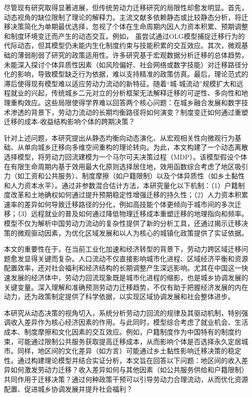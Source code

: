 \documentclass[a4paper,12pt,oneside, fontset=mac]{ctexbook} %
\begin{document}
尽管现有研究取得显著进展，但传统劳动力迁移研究的局限性却愈发明显。首先，动态视角的缺位限制了理论的解释力。主流文献多依赖静态或比较静态分析，将迁移决策简化为单期最优选择，忽视了个体在生命周期内因人力资本积累、预期调整和制度环境变迁而产生的动态交互。例如，
\cite{HanQiHengNongCunLaoDongLiQianYiMoCaYingXiangNongMinGongShuLiangYuGongZiJieGouMa2018}虽尝试通过OLG模型捕捉迁移行为的代际动态，但其模型仍未能内生化制度约束与技能积累的交互效应。其次，微观基础的薄弱削弱了研究的政策适用性。许多研究基于宏观数据分析迁移的总体趋势，未能深入探讨个体异质性因素（如风险偏好、社会网络或数字技能）对迁移路径分化的影响，导致模型缺乏行为依据，难以支持精准的政策仿真。最后，理论范式的滞后使得现有模型难以适应劳动力流动的新特征。随着“城-城流动”规模扩大和远程就业的兴起，传统城乡二元对立的分析框架无法解释迁移的可逆性、多向性和地理重构效应。这些局限使得学界难以回答两个核心问题：在城乡融合发展和数字技术渗透的背景下，劳动力流动的长期均衡路径将如何演变？制度变迁如何通过重塑迁移的成本-收益结构影响个体的跨期决策？

针对上述问题，本研究提出从静态均衡向动态演化、从宏观相关性向微观行为基础、从单向城乡迁移向多维空间重构的理论转向。为此，本文构建了一个动态离散选择模型，将劳动力回流建模为一个马尔可夫决策过程（MDP）。该模型假设个体在有限生命周期内基于效用最大化原则选择居住地，效用函数综合考虑了地区吸引力（如工资和公共服务）、制度摩擦（如户籍限制）以及个体异质性（如乡土黏性和人力资本水平）。通过非参数混合估计方法，本研究量化以下机制：（1）户籍制度改革和土地确权如何通过提升预期稳定性增强迁移的持久性；（2）人力资本积累速率的差异如何导致迁移路径的分化，例如高技能个体更倾向于城市间的多次迁移；（3）远程就业的普及如何通过降低物理迁移成本重塑迁移的地理指向和频率。模型不仅为解析中国劳动力流动的复杂性提供了新的分析工具，还通过揭示迁移决策的微观驱动因素，为优化区域发展和以人为核心的城镇化政策提供了实证依据。

本文的重要性在于，在当前工业化加速和经济转型的背景下，劳动力跨区域迁移问题愈发显得关键而复杂。人口流动不仅直接影响城市化进程、区域经济平衡和资源配置效率，还对社会福利和经济结构的长期调整产生深远影响。尤其在中国这一快速发展的经济体中，劳动力回流现象既是城市化进程的缩影，也是城乡协调发展的关键变量。深入理解和准确预测劳动力迁移趋势，不仅有助于把握经济发展的内在动力，还为政策制定提供了科学依据，以实现区域协调发展和社会整体进步。

本研究从动态决策的视角切入，系统分析劳动力回流的规律及其驱动机制，特别强调收入差异作为核心经济因素的作用。与此同时，模型综合考虑了就业机会、生活成本、制度摩擦和文化因素的交互效应。例如，户籍制度作为中国特有的制度约束，可能通过限制公共服务获取提高迁移成本，从而影响个体是否选择永久定居城市。同样，地区间的文化差异（如方言）可能通过乡土黏性影响迁移决策的稳定性。通过构建理论模型并结合实证分析，本文旨在回答以下问题：地区间的收入差异如何激发劳动力迁移？收入差异如何与其他因素（如公共服务供给和户籍限制）共同作用于迁移决策？通过何种政策干预可以引导劳动力合理流动，从而优化资源配置、促进城乡协调发展并提升社会福利？
\end{document}
